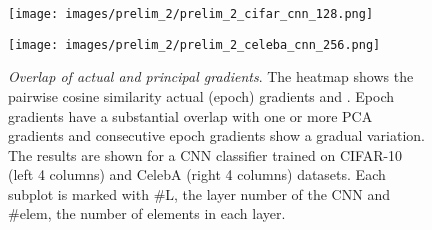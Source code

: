 \documentclass{article}
\newcommand{\shams}[1]{{\color{red}{#1}}}
\renewcommand{\shams}[1]{{\color{black}{#1}}}
\begin{document}
\begin{figure}[t]
\centering
\begin{minipage}{.495\textwidth}
  \centering
  \centerline{\texttt{[image: images/prelim\_2/prelim\_2\_cifar\_cnn\_128.png]}}
\end{minipage}
\begin{minipage}{.495\textwidth}
  \centering
  \centerline{\texttt{[image: images/prelim\_2/prelim\_2\_celeba\_cnn\_256.png]}}
\end{minipage}
    \vspace{-4mm}
  \caption{\small{\textit{Overlap of actual and principal gradients}. The heatmap shows the pairwise cosine similarity \shams{between} actual (epoch) gradients and \shams{principal gradient directions (PCA gradients)}. Epoch gradients have a substantial overlap with one or more PCA gradients and consecutive epoch gradients show a gradual variation.
  \shams{This suggest that there may exist a high overlap between the gradients generated during the NN model training.}
The results are shown for a CNN classifier trained on CIFAR-10 (left 4 columns) and CelebA (right 4 columns) datasets. Each subplot is marked with \#L, the layer number of the CNN and \#elem, the number of elements in each layer.}}
  \label{fig:prelim_2}
      \vspace{-2.5mm}
\end{figure}
\end{document}
